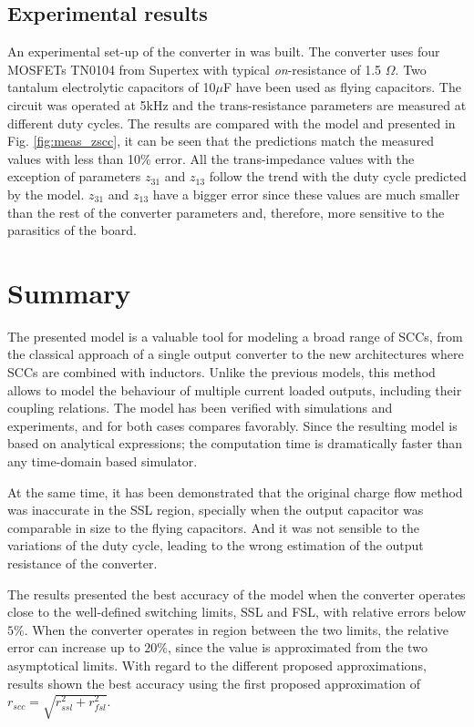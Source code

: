 \subsection{Experimental results}
An experimental set-up of the converter in was built. The converter uses four MOSFETs TN0104 from Supertex with typical \emph{on}-resistance of 1.5 $\Omega$. Two tantalum electrolytic capacitors of 10$\mu$F have been used as flying capacitors. The circuit was operated at 5kHz and the trans-resistance parameters are measured at different duty cycles. The results are compared with the model and  presented in Fig. \ref{fig:meas_zscc}, it can be seen that the predictions match the measured values with less than 10\% error. All the trans-impedance values with the exception of  parameters $z_{31}$ and $z_{13}$ follow the trend with the duty cycle predicted by the model. $z_{31}$ and $z_{13}$ have a bigger error since these values are much smaller than the rest of the converter parameters and, therefore, more sensitive to the parasitics of the board.





\section{Summary}
The presented model is a valuable tool for  modeling a broad range of SCCs, from the classical approach of a single output converter to the new architectures where SCCs are combined with inductors. Unlike the previous models, this method allows to model the behaviour of multiple current loaded outputs, including their coupling relations. The model has been verified with simulations and experiments, and for both cases compares favorably. Since the resulting model is based on analytical expressions; the computation time is dramatically faster than any time-domain based simulator.

At the same time, it has been demonstrated that the original charge flow method was inaccurate in the SSL region, specially when the output capacitor was comparable in size to the flying capacitors. And it was not sensible to the variations of the duty cycle, leading to the wrong estimation of the output resistance of the converter.

The results presented the best accuracy of the model when the converter operates close to the well-defined switching limits, SSL and FSL, with relative errors below $5\%$. When the converter operates in region between the two limits, the relative error can increase up to $20\%$, since the value is approximated from the two asymptotical limits. With regard to the different proposed approximations, results shown the best accuracy using the first proposed approximation of $r_{scc} = \sqrt{r_{ssl}^2 + r_{fsl}^2}$.

\clearpage

 